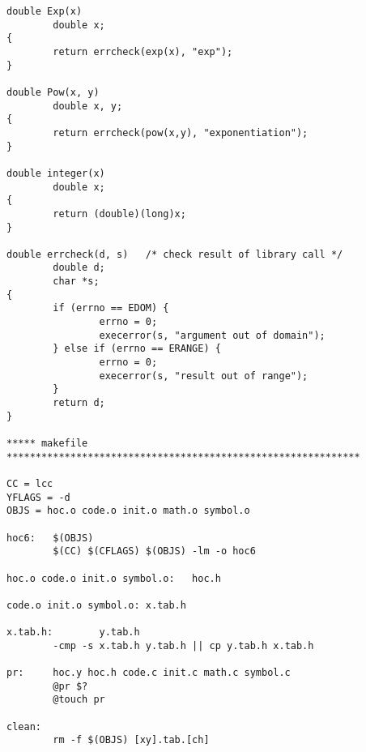 \begin{verbatim}
double Exp(x)
        double x;
{
        return errcheck(exp(x), "exp");
}

double Pow(x, y)
        double x, y;
{
        return errcheck(pow(x,y), "exponentiation");
}

double integer(x)
        double x;
{
        return (double)(long)x;
}

double errcheck(d, s)   /* check result of library call */
        double d;
        char *s;
{
        if (errno == EDOM) {
                errno = 0;
                execerror(s, "argument out of domain");
        } else if (errno == ERANGE) {
                errno = 0;
                execerror(s, "result out of range");
        }
        return d;
}

***** makefile *************************************************************

CC = lcc
YFLAGS = -d
OBJS = hoc.o code.o init.o math.o symbol.o

hoc6:   $(OBJS)
        $(CC) $(CFLAGS) $(OBJS) -lm -o hoc6

hoc.o code.o init.o symbol.o:   hoc.h

code.o init.o symbol.o: x.tab.h

x.tab.h:        y.tab.h
        -cmp -s x.tab.h y.tab.h || cp y.tab.h x.tab.h

pr:     hoc.y hoc.h code.c init.c math.c symbol.c
        @pr $?
        @touch pr

clean:
        rm -f $(OBJS) [xy].tab.[ch] 

\end{verbatim}
